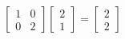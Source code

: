 \documentclass[preview]{standalone}
\begin{document}
\begin{align*}
\begin{bmatrix} 1 & 0 \\ 0 & 2 \end{bmatrix} \begin{bmatrix} 2 \\ 1 \end{bmatrix} = \begin{bmatrix} 2 \\ 2 \end{bmatrix}
\end{align*}
\end{document}
